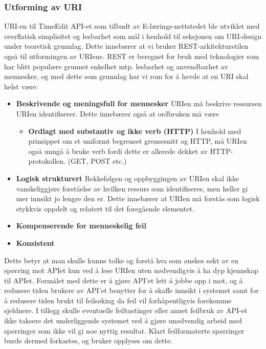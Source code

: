 \documentclass[../main.tex]{subfiles}
\begin{document}
\subsubsection{Utforming av URI}
URI-en til TimeEdit API-et som tilbudt av E-lærings-nettstedet ble utviklet med overflatisk simplisitet og lesbarhet som mål i henhold til seksjonen om URI-design under teoretisk grunnlag. Dette innebærer at vi bruker REST-arkitekturstilen også til utformingen av URIene. REST er beregnet for bruk med teknologier som har blitt populære grunnet enkelhet mtp. lesbarhet og anvendbarhet av mennesker, og med dette som grunnlag har vi rom for å hevde at en URI skal helst være:
\begin{itemize}
\item \textbf{Beskrivende og meningsfull for mennesker} \newline
URIen må beskrive ressursen URIen identifiserer. Dette innebærer også at ordbruken må være
\begin{itemize}
\item \textbf{Ordlagt med substantiv og ikke verb (HTTP)} \newline
I henhold med prinsippet om et uniformt begrenset grensesnitt og HTTP, må URIen også unngå å bruke verb fordi dette er allerede dekket av HTTP-protokollen. (GET, POST etc.)
\end{itemize}
\item \textbf{Logisk strukturert} \newline
Rekkefølgen og oppbyggingen av URIen skal ikke vanskeliggjøre forståelse av hvilken ressurs som identifiseres, men heller gi mer innsikt jo lengre den er. Dette innebærer at URIen må forstås som logisk stykkvis oppdelt og relatert til det foregående elementet.
\item \textbf{Kompenserende for menneskelig feil}
\item \textbf{Konsistent}
\end{itemize}

Dette betyr at man skulle kunne tolke og forstå hva som ønskes søkt av en spørring mot APIet kun ved å lese URIen uten nødvendigvis å ha dyp kjennskap til APIet. Formålet med dette er å gjøre API’et lett å jobbe opp i mot, og å redusere tiden brukere av API’et benytter for å skaffe innsikt i systemet samt for å redusere tiden brukt til feilsøking da feil vil forhåpentligvis forekomme sjeldnere.
I tillegg skulle eventuelle feiltastinger eller annet feilbruk av API-et ikke taksere det underliggende systemet ved å gjøre unødvendig arbeid med spørringer som ikke vil gi noe nyttig resultat. Klart feilformaterte spørringer burde dermed forkastes, og bruker opplyses om dette.
\end{document}
